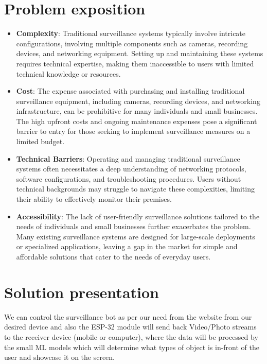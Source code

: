 \documentclass[12pt]{article}
\begin{document}
\section{Problem exposition} 
\begin{itemize}
    \item \textbf{Complexity}: Traditional surveillance systems typically involve intricate configurations, involving multiple components such as cameras, recording devices, and networking equipment. Setting up and maintaining these systems requires technical expertise, making them inaccessible to users with limited technical knowledge or resources.

    \item \textbf{Cost}: The expense associated with purchasing and installing traditional surveillance equipment, including cameras, recording devices, and networking infrastructure, can be prohibitive for many individuals and small businesses. The high upfront costs and ongoing maintenance expenses pose a significant barrier to entry for those seeking to implement surveillance measures on a limited budget.
    \item \textbf{Technical Barriers}: Operating and managing traditional surveillance systems often necessitates a deep understanding of networking protocols, software configurations, and troubleshooting procedures. Users without technical backgrounds may struggle to navigate these complexities, limiting their ability to effectively monitor their premises.
    \item \textbf{Accessibility}: The lack of user-friendly surveillance solutions tailored to the needs of individuals and small businesses further exacerbates the problem. Many existing surveillance systems are designed for large-scale deployments or specialized applications, leaving a gap in the market for simple and affordable solutions that cater to the needs of everyday users.
    
\end{itemize}

\section{Solution presentation}

We can control the surveillance bot as per our need from the website from our desired device and also the ESP-32 module will send back Video/Photo streams to the receiver device (mobile or computer), where the data will be processed by the small ML models which will determine what types of object is in-front of the user and showcase it on the screen.\\
\end{document}
